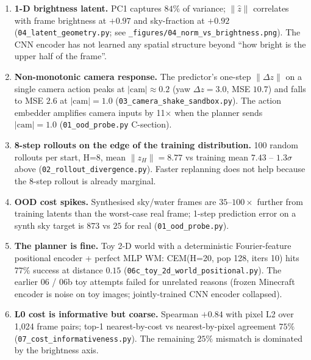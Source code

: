 \documentclass[11pt]{article}
\begin{document}
\begin{enumerate}[leftmargin=*,itemsep=2pt]
\item \textbf{1-D brightness latent.}
PC1 captures $84\%$ of variance; $\|\hat z\|$ correlates with
frame brightness at $+0.97$ and sky-fraction at $+0.92$
(\texttt{04\_latent\_geometry.py}; see
\texttt{\_figures/04\_norm\_vs\_brightness.png}). The CNN encoder
has not learned any spatial structure beyond ``how bright is the
upper half of the frame''.

\item \textbf{Non-monotonic camera response.}
The predictor's one-step $\| \Delta z \|$ on a single camera action
peaks at $|\mathrm{cam}| \approx 0.2$ (yaw $\Delta z = 3.0$, MSE
$10.7$) and falls to MSE $2.6$ at $|\mathrm{cam}| = 1.0$
(\texttt{03\_camera\_shake\_sandbox.py}). The action embedder
amplifies camera inputs by 11$\times$ when the planner sends
$|\mathrm{cam}|=1.0$ (\texttt{01\_ood\_probe.py} C-section).

\item \textbf{8-step rollouts on the edge of the training
distribution.} 100 random rollouts per start, H=8, mean
$\|z_H\| = 8.77$ vs training mean $7.43$ -- $1.3\sigma$ above
(\texttt{02\_rollout\_divergence.py}). Faster replanning does not
help because the 8-step rollout is already marginal.

\item \textbf{OOD cost spikes.}
Synthesised sky/water frames are $35$--$100\times$ further from
training latents than the worst-case real frame; 1-step prediction
error on a synth sky target is $873$ vs $25$ for real
(\texttt{01\_ood\_probe.py}).

\item \textbf{The planner is fine.}
Toy 2-D world with a deterministic Fourier-feature positional
encoder + perfect MLP WM: CEM(H=20, pop 128, iters 10) hits
$77\%$ success at distance $0.15$ (\texttt{06c\_toy\_2d\_world\_positional.py}).
The earlier 06 / 06b toy attempts failed for unrelated reasons
(frozen Minecraft encoder is noise on toy images; jointly-trained
CNN encoder collapsed).

\item \textbf{L0 cost is informative but coarse.}
Spearman $+0.84$ with pixel L2 over 1{,}024 frame pairs; top-1
nearest-by-cost vs nearest-by-pixel agreement $75\%$
(\texttt{07\_cost\_informativeness.py}). The remaining $25\%$
mismatch is dominated by the brightness axis.
\end{enumerate}
\end{document}
